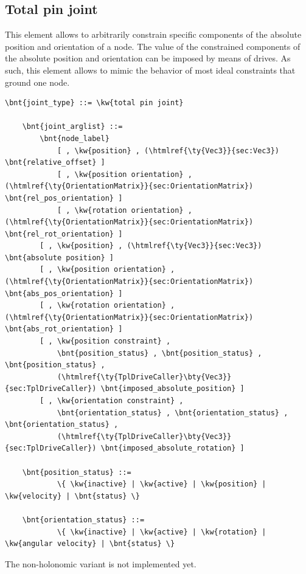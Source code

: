 \subsection{Total pin joint}
This element allows to arbitrarily constrain specific components
of the absolute position and orientation of a node.
The value of the constrained components of the absolute position
and orientation can be imposed by means of drives.
As such, this element allows to mimic the behavior of most
ideal constraints that ground one node.
\label{sec:EL:STRUCT:JOINT:TOTAL_PIN_JOINT}
\begin{Verbatim}[commandchars=\\\{\}]
    \bnt{joint_type} ::= \kw{total pin joint}

    \bnt{joint_arglist} ::=
        \bnt{node_label}
            [ , \kw{position} , (\htmlref{\ty{Vec3}}{sec:Vec3}) \bnt{relative_offset} ]
            [ , \kw{position orientation} , (\htmlref{\ty{OrientationMatrix}}{sec:OrientationMatrix}) \bnt{rel_pos_orientation} ]
            [ , \kw{rotation orientation} , (\htmlref{\ty{OrientationMatrix}}{sec:OrientationMatrix}) \bnt{rel_rot_orientation} ]
        [ , \kw{position} , (\htmlref{\ty{Vec3}}{sec:Vec3}) \bnt{absolute position} ]
        [ , \kw{position orientation} , (\htmlref{\ty{OrientationMatrix}}{sec:OrientationMatrix}) \bnt{abs_pos_orientation} ]
        [ , \kw{rotation orientation} , (\htmlref{\ty{OrientationMatrix}}{sec:OrientationMatrix}) \bnt{abs_rot_orientation} ]
        [ , \kw{position constraint} ,
            \bnt{position_status} , \bnt{position_status} , \bnt{position_status} ,
            (\htmlref{\ty{TplDriveCaller}\bty{Vec3}}{sec:TplDriveCaller}) \bnt{imposed_absolute_position} ]
        [ , \kw{orientation constraint} ,
            \bnt{orientation_status} , \bnt{orientation_status} , \bnt{orientation_status} ,
            (\htmlref{\ty{TplDriveCaller}\bty{Vec3}}{sec:TplDriveCaller}) \bnt{imposed_absolute_rotation} ]

    \bnt{position_status} ::=
            \{ \kw{inactive} | \kw{active} | \kw{position} | \kw{velocity} | \bnt{status} \}

    \bnt{orientation_status} ::=
            \{ \kw{inactive} | \kw{active} | \kw{rotation} | \kw{angular velocity} | \bnt{status} \}
\end{Verbatim}
The non-holonomic variant is not implemented yet.

